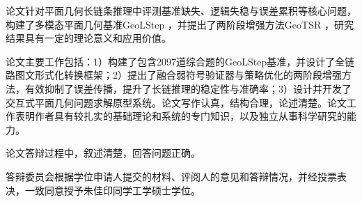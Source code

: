 




论文针对平面几何长链条推理中评测基准缺失、逻辑失稳与误差累积等核心问题，构建了多模态平面几何基准GeoLStep ，并提出了两阶段增强方法GeoTSR ，研究结果具有一定的理论意义和应用价值。

论文主要工作包括：1）构建了包含2097道综合题的GeoLStep基准，并设计了全链路图文形式化转换框架；2）提出了融合弱符号验证器与策略优化的两阶段增强方法，有效抑制了误差传播，提升了长链推理的稳定性与准确率；3）设计并开发了交互式平面几何问题求解原型系统。论文写作认真，结构合理，论述清楚。论文工作表明作者具有较扎实的基础理论和系统的专门知识，以及独立从事科学研究的能力。

论文答辩过程中，叙述清楚，回答问题正确。

答辩委员会根据学位申请人提交的材料、评阅人的意见和答辩情况，并经投票表决，一致同意授予朱佳印同学工学硕士学位。
